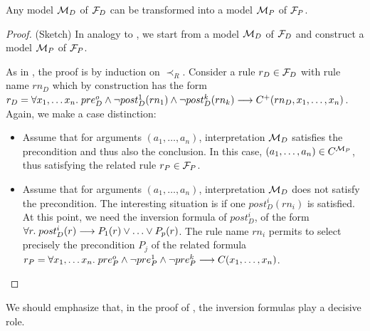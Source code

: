 \begin{lemma}\label{lemma:md_to_mp}
  Any model ${\cal M}_D$ of ${\cal F}_D$ can be transformed into a model
  ${\cal M}_P$ of ${\cal F}_P$.
\end{lemma}

\begin{proof} (Sketch)
  In analogy to , we start from a model ${\cal M}_D$
  of ${\cal F}_D$ and construct a model ${\cal M}_P$ of ${\cal F}_P$. 

  As in , the proof is by induction on $\prec_R$.
  Consider a rule $r_D \in {\cal F}_D$ with rule
  name $rn_D$ which by construction has the form
  $r_D = \forall x_1, \dots x_n.\; pre_D^o \land \lnot post_D^1(rn_1) \land \lnot post_D^k(rn_k)
  \longrightarrow C^+(rn_D, x_1, \dots, x_n)$. Again, we make a case distinction:
  \begin{itemize}
  \item Assume that for arguments $(a_1, \dots, a_n)$, interpretation
    ${\cal M}_D$ satisfies the precondition and thus also the conclusion. In
    this case, $(a_1, \dots, a_n)\in C^{{\cal M}_P}$, thus satisfying the
    related rule $r_P \in {\cal F}_P$.
  \item Assume that for arguments $(a_1, \dots, a_n)$, interpretation
    ${\cal M}_D$ does not satisfy the precondition. The interesting situation
    is if one $post_D^i(rn_i)$ is satisfied. At this point, we need the
    inversion formula of $post_D^i$, of the form
    $\forall r.\; post_D^i(r) \IMPL P_1(r) \OR \dots \OR P_p(r)$. The rule
    name $rn_i$ permits to select precisely the precondition $P_j$ of the
    related formula
    $r_P = \forall x_1, \dots x_n.\; pre_P^o \land \lnot pre_P^1 \land \lnot
    pre_P^k \longrightarrow C(x_1, \dots, x_n)$.
  \end{itemize}
\end{proof}
We should emphasize that, in the proof of , the
inversion formulas play a decisive role.


